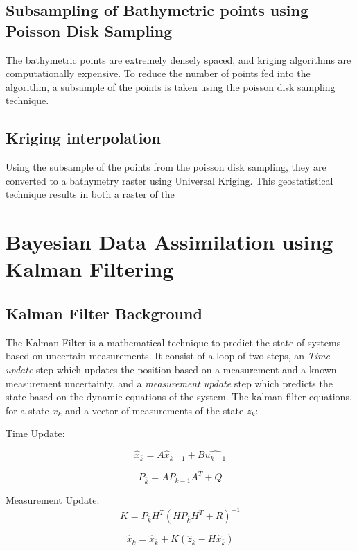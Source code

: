 \subsection{Subsampling of Bathymetric points using Poisson Disk Sampling} \label{subsec:poissonsubsampling}
The bathymetric points are extremely densely spaced, and kriging algorithms are computationally expensive. To reduce the number of points fed into the algorithm, a subsample of the points is taken using the poisson disk sampling technique. 

\subsection{Kriging interpolation}
Using the subsample of the points from the poisson disk sampling, they are converted to a bathymetry raster using Universal Kriging. This geostatistical technique results in both a raster of the 


\section{Bayesian Data Assimilation using Kalman Filtering}
\subsection{Kalman Filter Background}
The Kalman Filter is a mathematical technique to predict the state of systems based on uncertain measurements. It consist of a loop of two steps, an \emph{Time update} step which updates the position based on a measurement and a known measurement uncertainty, and a \emph{measurement update} step which predicts the state based on the dynamic equations of the system. The kalman filter equations, for a state $x_k$ and a vector of measurements of the state $z_k$:

Time Update:

\begin{equation}
    \hat{x}_{\bar{k}} = A\hat{x}_{k-1} + B\hat{u_{k-1}}
\end{equation}

\begin{equation}
    P_{\bar{k}} = A P_{k-1} A^T + Q
\end{equation}

Measurement Update:
\begin{equation}
    K = P_{\bar{k}} H^T(H P_{\bar{k}} H^T + R) ^{-1}
\end{equation}

\begin{equation}
    \hat{x}_k = \hat{x}_{\bar{k}} + K(\hat{z}_k - H \hat{x}_{\bar{k}})
\end{equation}


